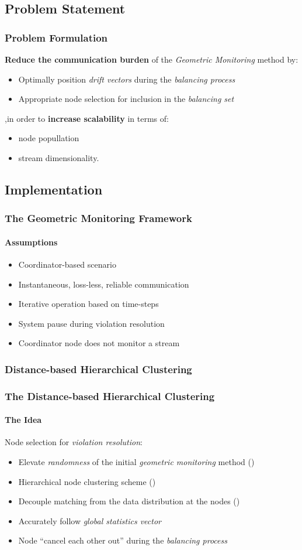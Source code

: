 \documentclass[hyperref={pdfpagelabels=false}]{beamer}
\begin{document}
\subsection{Problem Statement}
\begin{frame} \frametitle{Problem Formulation}
\textbf{Reduce the communication burden} of the \emph{Geometric Monitoring} method by:
\begin{itemize}
\item Optimally position \emph{drift vectors} during the \emph{balancing process}
\item Appropriate node selection for inclusion in the \emph{balancing set}
\end{itemize}
,in order to \textbf{increase scalability} in terms of:
\begin{itemize}
\item node popullation
\item stream dimensionality.
\end{itemize}
\end{frame}
\subsection{Implementation}

\begin{frame} \frametitle{The Geometric Monitoring Framework} \framesubtitle{Assumptions}
\begin{itemize}
\item Coordinator-based scenario
\item Instantaneous, loss-less, reliable communication
\item Iterative operation based on time-steps
\item System pause during violation resolution
\item Coordinator node does not monitor a stream
\end{itemize}
\end{frame}

\subsubsection*{Distance-based Hierarchical Clustering}
\begin{frame} \frametitle{The Distance-based Hierarchical Clustering}\framesubtitle{The Idea}
Node selection for \emph{violation resolution}:
\begin{itemize}
\item Elevate \emph{randomness} of the initial \emph{geometric monitoring} method {\tiny()}
\item Hierarchical node clustering scheme {\tiny()}
\item Decouple matching from the data distribution at the nodes {\tiny()}
\item Accurately follow \emph{global statistics vector}
\item Node ``cancel each other out'' during the \emph{balancing process}
\end{itemize}
\end{frame}
\end{document}
